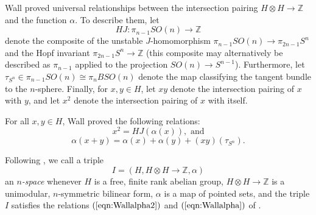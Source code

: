 \begin{rec} \label{rec:Wallrelations}
Wall proved universal relationships between the intersection pairing $H \otimes H \to \mathbb{Z}$ and the function $\alpha$.
To describe them, let 
$$HJ:\pi_{n-1} SO(n) \to \mathbb{Z}$$ 
denote the composite of the unstable $J$-homomorphism $\pi_{n-1} SO(n) \to \pi_{2n-1} S^{n}$ and the Hopf invariant $\pi_{2n-1} S^{n} \to \mathbb{Z}$ (this composite may alternatively be described as $\pi_{n-1}$ applied to the projection $SO(n) \to S^{n-1}$).
Furthermore, let $\tau_{S^n} \in \pi_{n-1} SO(n) \cong \pi_n BSO(n)$ denote the map classifying the tangent bundle to the $n$-sphere.
Finally, for $x,y \in H$, let $xy$ denote the intersection pairing of $x$ with $y$, and let $x^2$ denote the intersection pairing of $x$ with itself.  

For all $x,y \in H$, Wall proved \cite[Lemma 2]{Wall62} the following relations:
\begin{equation} \label{eqn:Wallalpha2}
x^2 = HJ(\alpha(x)), \text{ and}
\end{equation}
\begin{equation} \label{eqn:Wallalpha}
\alpha(x+y) = \alpha(x)+\alpha(y) + (xy)(\tau_{S^n}).
\end{equation}
\end{rec}

\begin{dfn} \label{dfn:nspace}
Following \cite[p. 169]{Wall62}, we call a triple
$$I=(H,H \otimes H \to \mathbb{Z}, \alpha)$$
an \emph{$n$-space} whenever $H$ is a free, finite rank abelian group, $H \otimes H \to \mathbb{Z}$ is a unimodular, $n$-symmetric bilinear form, $\alpha$ is a map of pointed sets, and the triple $I$ satisfies the relations $(\ref{eqn:Wallalpha2})$ and $(\ref{eqn:Wallalpha})$ of .
\end{dfn}

